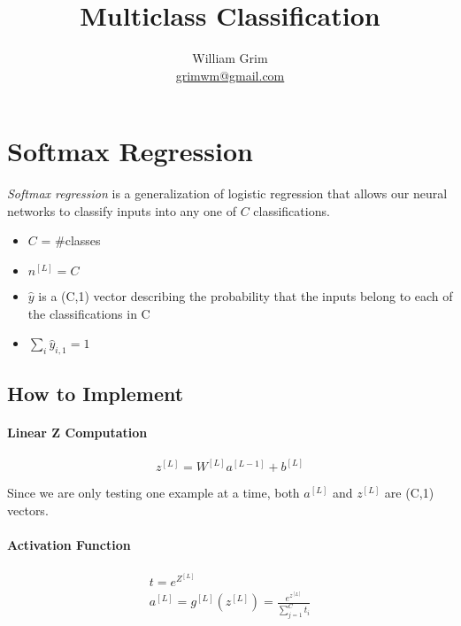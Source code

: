\documentclass{article}
\begin{document}
\title {Multiclass Classification}
\author{William Grim \\ \href{mailto:grimwm@gmail.com}{grimwm@gmail.com}}

\maketitle

\tableofcontents

\section{Softmax Regression}

\textit{Softmax regression} is a generalization of logistic regression that allows our neural networks to classify inputs into any one of $C$ classifications.

\begin{itemize}
\item $C$ = \#classes
\item $n^{[L]} = C$
\item $\hat{y}$ is a (C,1) vector describing the probability that the inputs belong to each of the classifications in C
\item $\sum_{i} \hat{y}_{i,1} = 1$
\end{itemize}

\subsection{How to Implement}

\paragraph{Linear Z Computation}

\begin{equation}
z^{[L]} = W^{[L]}a^{[L-1]} + b^{[L]}
\end{equation}

Since we are only testing one example at a time, both $a^{[L]}$ and $z^{[L]}$ are (C,1) vectors.

\paragraph{Activation Function}

\begin{gather}
t = e^{Z^{[L]}} \\
a^{[L]} = g^{[L]}(z^{[L]}) = \frac{e^{z^{[L]}}}{\sum_{j=1}^{C} t_i}
\end{gather}
\end{document}
